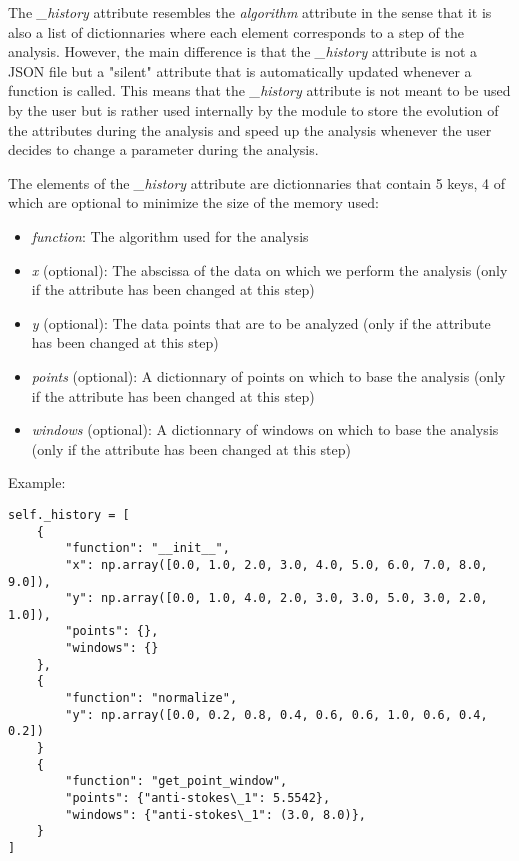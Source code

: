 The \textit{\_history} attribute resembles the \textit{algorithm} attribute in the sense that it is also a list of dictionnaries where each element corresponds to a step of the analysis. However, the main difference is that the \textit{\_history} attribute is not a JSON file but a "silent" attribute that is automatically updated whenever a function is called. This means that the \textit{\_history} attribute is not meant to be used by the user but is rather used internally by the module to store the evolution of the attributes during the analysis and speed up the analysis whenever the user decides to change a parameter during the analysis.

The elements of the \textit{\_history} attribute are dictionnaries that contain 5 keys, 4 of which are optional to minimize the size of the memory used:
\begin{itemize}
    \item \textit{function}: The algorithm used for the analysis
    \item \textit{x} (optional): The abscissa of the data on which we perform the analysis (only if the attribute has been changed at this step)
    \item \textit{y} (optional): The data points that are to be analyzed (only if the attribute has been changed at this step)
    \item \textit{points} (optional): A dictionnary of points on which to base the analysis (only if the attribute has been changed at this step)
    \item \textit{windows} (optional): A dictionnary of windows on which to base the analysis (only if the attribute has been changed at this step)
\end{itemize}

Example:
\begin{lstlisting}
self._history = [
    {
        "function": "__init__",
        "x": np.array([0.0, 1.0, 2.0, 3.0, 4.0, 5.0, 6.0, 7.0, 8.0, 9.0]),
        "y": np.array([0.0, 1.0, 4.0, 2.0, 3.0, 3.0, 5.0, 3.0, 2.0, 1.0]),
        "points": {},
        "windows": {}
    },
    {
        "function": "normalize",
        "y": np.array([0.0, 0.2, 0.8, 0.4, 0.6, 0.6, 1.0, 0.6, 0.4, 0.2])
    }
    {
        "function": "get_point_window",
        "points": {"anti-stokes\_1": 5.5542},
        "windows": {"anti-stokes\_1": (3.0, 8.0)},
    }
]
\end{lstlisting}